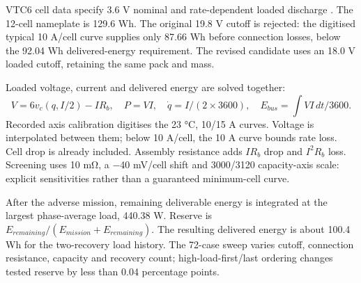 \documentclass[a4paper,11pt]{article}
\begin{document}
VTC6 cell data specify 3.6 V nominal and rate-dependent loaded discharge \cite{r38}. The 12-cell nameplate is 129.6 Wh. The original 19.8 V cutoff is rejected: the digitised typical 10 A/cell curve supplies only 87.66 Wh before connection losses, below the 92.04 Wh delivered-energy requirement. The revised candidate uses an 18.0 V loaded cutoff, retaining the same pack and mass.

Loaded voltage, current and delivered energy are solved together:
\begin{equation}V=6v_c(q,I/2)-IR_b,\quad P=VI,\quad \dot q=I/(2\times3600),\quad E_{bus}=\int VI\,dt/3600.\end{equation}
Recorded axis calibration digitises the 23 °C, 10/15 A curves. Voltage is interpolated between them; below 10 A/cell, the 10 A curve bounds rate loss. Cell drop is already included. Assembly resistance adds $IR_b$ drop and $I^2R_b$ loss. Screening uses 10 mΩ, a −40 mV/cell shift and 3000/3120 capacity-axis scale: explicit sensitivities rather than a guaranteed minimum-cell curve.

After the adverse mission, remaining deliverable energy is integrated at the largest phase-average load, 440.38 W. Reserve is $E_{remaining}/(E_{mission}+E_{remaining})$. The resulting delivered energy is about 100.4 Wh for the two-recovery load history. The 72-case sweep varies cutoff, connection resistance, capacity and recovery count; high-load-first/last ordering changes tested reserve by less than 0.04 percentage points.
\end{document}
